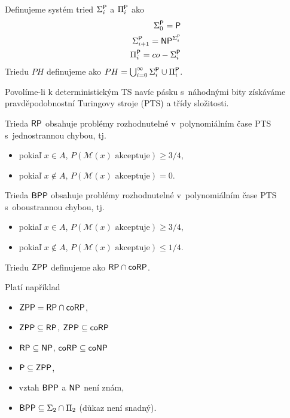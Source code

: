 \begin{definition}
	Definujeme systém tried $\Sigma_i^\P$ a $\Pi_i^\P$ ako
	\begin{align*}
		\Sigma_0^\P = \P \\
		\Sigma_{i+1}^{\P} = \NP^{\Sigma_i^{\P}} \\
		\Pi_i^{\P} = co-\Sigma_i^{\P}
	\end{align*}
	Triedu $PH$ definujeme ako $PH=\bigcup_{i=0}^{\infty} \Sigma_i^\P \cup \Pi_i^\P$.
\end{definition}

Povolíme-li k deterministickým TS navíc pásku s~náhodnými bity získáváme pravděpodobnostní
Turingovy stroje (PTS) a třídy složitosti.

\begin{definition}
	Trieda $\RP$ obsahuje problémy rozhodnutelné v~polynomiálním čase 
	PTS s~jednostrannou chybou, tj.
	\begin{itemize}
		\item pokiaľ $x \in A$, $P(\mathcal{M}(x) \text{ akceptuje}) \geq 3/4$,
		\item pokiaľ $x \not\in A$, $P(\mathcal{M}(x) \text{ akceptuje}) = 0$.
	\end{itemize}
\end{definition}

\begin{definition}
	Trieda $\BPP$ obsahuje problémy rozhodnutelné v~polynomiálním čase 
	PTS s~oboustrannou chybou, tj.
	\begin{itemize}
		\item pokiaľ $x \in A$, $P(\mathcal{M}(x) \text{ akceptuje}) \geq 3/4$,
		\item pokiaľ $x \not\in A$, $P(\mathcal{M}(x) \text{ akceptuje}) \leq 1/4$.
	\end{itemize}
\end{definition}

\begin{definition}
	Triedu $\ZPP$ definujeme ako $\RP \cap \coRP$.
\end{definition}

Platí například
\begin{itemize}
    \item $\ZPP = \RP \cap \coRP$,
	\item $\ZPP \subseteq \RP$, $\ZPP \subseteq \coRP$
	\item $\RP \subseteq \NP$, $\coRP \subseteq \coNP$
    \item $\P \subseteq \ZPP$,
    \item vztah $\BPP$ a $\NP$ není znám,
    \item $\BPP \subseteq \Sigma_2 \cap \Pi_2$ (důkaz není snadný).
\end{itemize}

